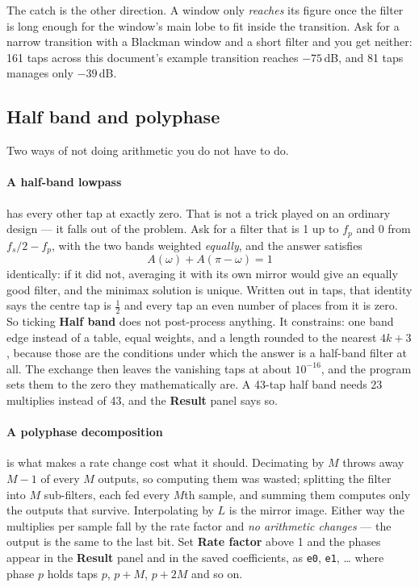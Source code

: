 \documentclass[11pt,a4paper]{article}
\newcommand{\ctl}[1]{\textbf{#1}}
\newcommand{\lit}[1]{\texttt{#1}}
\begin{document}
The catch is the other direction. A window only \emph{reaches} its figure once
the filter is long enough for the window's main lobe to fit inside the
transition. Ask for a narrow transition with a Blackman window and a short
filter and you get neither: 161 taps across this document's example transition
reaches $-75$\,dB, and 81 taps manages only $-39$\,dB.

\subsection{Half band and polyphase}
\label{sec:halfband}

Two ways of not doing arithmetic you do not have to do.

\paragraph{A half-band lowpass} has every other tap at exactly zero. That is not
a trick played on an ordinary design --- it falls out of the problem. Ask for a
filter that is 1 up to $f_p$ and 0 from $f_s/2 - f_p$, with the two bands
weighted \emph{equally}, and the answer satisfies
\[
  A(\omega) + A(\pi - \omega) = 1
\]
identically: if it did not, averaging it with its own mirror would give an
equally good filter, and the minimax solution is unique. Written out in taps,
that identity says the centre tap is $\tfrac12$ and every tap an even number of
places from it is zero. So ticking \ctl{Half band} does not post-process
anything. It constrains: one band edge instead of a table, equal weights, and a
length rounded to the nearest $4k+3$, because those are the conditions under
which the answer is a half-band filter at all. The exchange then leaves the
vanishing taps at about $10^{-16}$, and the program sets them to the zero they
mathematically are. A 43-tap half band needs 23 multiplies instead of 43, and
the \ctl{Result} panel says so.

\paragraph{A polyphase decomposition} is what makes a rate change cost what it
should. Decimating by $M$ throws away $M-1$ of every $M$ outputs, so computing
them was wasted; splitting the filter into $M$ sub-filters, each fed every $M$th
sample, and summing them computes only the outputs that survive. Interpolating
by $L$ is the mirror image. Either way the multiplies per sample fall by the
rate factor and \emph{no arithmetic changes} --- the output is the same to the
last bit. Set \ctl{Rate factor} above 1 and the phases appear in the
\ctl{Result} panel and in the saved coefficients, as \lit{e0}, \lit{e1},
\dots{} where phase $p$ holds taps $p$, $p+M$, $p+2M$ and so on.
\end{document}
